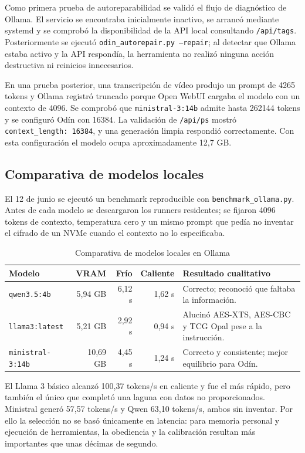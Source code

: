 Como primera prueba de autoreparabilidad se validó el flujo de diagnóstico de Ollama. El servicio se encontraba inicialmente inactivo, se arrancó mediante systemd y se comprobó la disponibilidad de la API local consultando \texttt{/api/tags}. Posteriormente se ejecutó \texttt{odin\_autorepair.py --repair}; al detectar que Ollama estaba activo y la API respondía, la herramienta no realizó ninguna acción destructiva ni reinicios innecesarios.

En una prueba posterior, una transcripción de vídeo produjo un prompt de 4265 tokens y Ollama registró truncado porque Open WebUI cargaba el modelo con un contexto de 4096. Se comprobó que \texttt{ministral-3:14b} admite hasta 262144 tokens y se configuró Odín con 16384. La validación de \texttt{/api/ps} mostró \texttt{context\_length: 16384}, y una generación limpia respondió correctamente. Con esta configuración el modelo ocupa aproximadamente 12,7 GB.

\subsection{Comparativa de modelos locales}
El 12 de junio se ejecutó un benchmark reproducible con \texttt{benchmark\_ollama.py}. Antes de cada modelo se descargaron los runners residentes; se fijaron 4096 tokens de contexto, temperatura cero y un mismo prompt que pedía no inventar el cifrado de un NVMe cuando el contexto no lo especificaba.

\begin{table}[H]
  \centering
  \caption{Comparativa de modelos locales en Ollama}
  \label{tab:benchmark-ollama}
  \begin{tabularx}{\textwidth}{l r r r X}
    \toprule
    Modelo & VRAM & Frío & Caliente & Resultado cualitativo \\
    \midrule
    \texttt{qwen3.5:4b} & 5,94 GB & 6,12 s & 1,62 s & Correcto; reconoció que faltaba la información. \\
    \texttt{llama3:latest} & 5,21 GB & 2,92 s & 0,94 s & Alucinó AES-XTS, AES-CBC y TCG Opal pese a la instrucción. \\
    \texttt{ministral-3:14b} & 10,69 GB & 4,45 s & 1,24 s & Correcto y consistente; mejor equilibrio para Odín. \\
    \bottomrule
  \end{tabularx}
\end{table}

El Llama 3 básico alcanzó 100,37 tokens/s en caliente y fue el más rápido, pero también el único que completó una laguna con datos no proporcionados. Ministral generó 57,57 tokens/s y Qwen 63,10 tokens/s, ambos sin inventar. Por ello la selección no se basó únicamente en latencia: para memoria personal y ejecución de herramientas, la obediencia y la calibración resultan más importantes que unas décimas de segundo.

